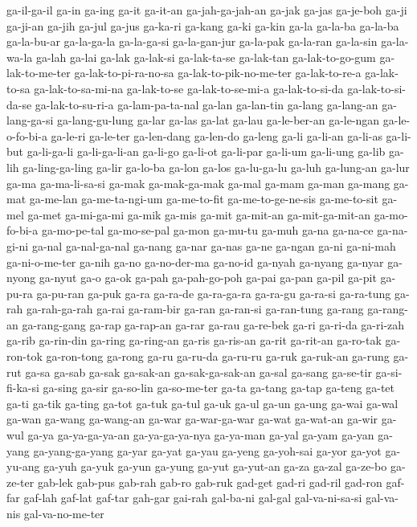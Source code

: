{ga-il-ga-il ga-in ga-ing ga-it ga-it-an ga-jah-ga-jah-an ga-jak ga-jas
ga-je-boh ga-ji ga-ji-an ga-jih ga-jul ga-jus ga-ka-ri ga-kang ga-ki
ga-kin ga-la ga-la-ba ga-la-ba ga-la-bu-ar ga-la-ga-la ga-la-ga-si
ga-la-gan-jur ga-la-pak ga-la-ran ga-la-sin ga-la-wa-la ga-lah ga-lai
ga-lak ga-lak-si ga-lak-ta-se ga-lak-tan ga-lak-to-go-gum ga-lak-to-me-ter
ga-lak-to-pi-ra-no-sa ga-lak-to-pik-no-me-ter ga-lak-to-re-a ga-lak-to-sa
ga-lak-to-sa-mi-na ga-lak-to-se ga-lak-to-se-mi-a ga-lak-to-si-da
ga-lak-to-si-da-se ga-lak-to-su-ri-a ga-lam-pa-ta-nal ga-lan ga-lan-tin
ga-lang ga-lang-an ga-lang-ga-si ga-lang-gu-lung ga-lar ga-las ga-lat
ga-lau ga-le-ber-an ga-le-ngan ga-le-o-fo-bi-a ga-le-ri ga-le-ter
ga-len-dang ga-len-do ga-leng ga-li ga-li-an ga-li-as ga-li-but
ga-li-ga-li ga-li-ga-li-an ga-li-go ga-li-ot ga-li-par ga-li-um ga-li-ung
ga-lib ga-lih ga-ling-ga-ling ga-lir ga-lo-ba ga-lon ga-los ga-lu-ga-lu
ga-luh ga-lung-an ga-lur ga-ma ga-ma-li-sa-si ga-mak ga-mak-ga-mak ga-mal
ga-mam ga-man ga-mang ga-mat ga-me-lan ga-me-ta-ngi-um ga-me-to-fit
ga-me-to-ge-ne-sis ga-me-to-sit ga-mel ga-met ga-mi-ga-mi ga-mik ga-mis
ga-mit ga-mit-an ga-mit-ga-mit-an ga-mo-fo-bi-a ga-mo-pe-tal ga-mo-se-pal
ga-mon ga-mu-tu ga-muh ga-na ga-na-ce ga-na-gi-ni ga-nal ga-nal-ga-nal
ga-nang ga-nar ga-nas ga-ne ga-ngan ga-ni ga-ni-mah ga-ni-o-me-ter ga-nih
ga-no ga-no-der-ma ga-no-id ga-nyah ga-nyang ga-nyar ga-nyong ga-nyut ga-o
ga-ok ga-pah ga-pah-go-poh ga-pai ga-pan ga-pil ga-pit ga-pu-ra ga-pu-ran
ga-puk ga-ra ga-ra-de ga-ra-ga-ra ga-ra-gu ga-ra-si ga-ra-tung ga-rah
ga-rah-ga-rah ga-rai ga-ram-bir ga-ran ga-ran-si ga-ran-tung ga-rang
ga-rang-an ga-rang-gang ga-rap ga-rap-an ga-rar ga-rau ga-re-bek ga-ri
ga-ri-da ga-ri-zah ga-rib ga-rin-din ga-ring ga-ring-an ga-ris ga-ris-an
ga-rit ga-rit-an ga-ro-tak ga-ron-tok ga-ron-tong ga-rong ga-ru ga-ru-da
ga-ru-ru ga-ruk ga-ruk-an ga-rung ga-rut ga-sa ga-sab ga-sak ga-sak-an
ga-sak-ga-sak-an ga-sal ga-sang ga-se-tir ga-si-fi-ka-si ga-sing ga-sir
ga-so-lin ga-so-me-ter ga-ta ga-tang ga-tap ga-teng ga-tet ga-ti ga-tik
ga-ting ga-tot ga-tuk ga-tul ga-uk ga-ul ga-un ga-ung ga-wai ga-wal ga-wan
ga-wang ga-wang-an ga-war ga-war-ga-war ga-wat ga-wat-an ga-wir ga-wul
ga-ya ga-ya-ga-ya-an ga-ya-ga-ya-nya ga-ya-man ga-yal ga-yam ga-yan
ga-yang ga-yang-ga-yang ga-yar ga-yat ga-yau ga-yeng ga-yoh-sai ga-yor
ga-yot ga-yu-ang ga-yuh ga-yuk ga-yun ga-yung ga-yut ga-yut-an ga-za
ga-zal ga-ze-bo ga-ze-ter gab-lek gab-pus gab-rah gab-ro gab-ruk gad-get
gad-ri gad-ril gad-ron gaf-far gaf-lah gaf-lat gaf-tar gah-gar gai-rah
gal-ba-ni gal-gal gal-va-ni-sa-si gal-va-nis gal-va-no-me-ter
}
